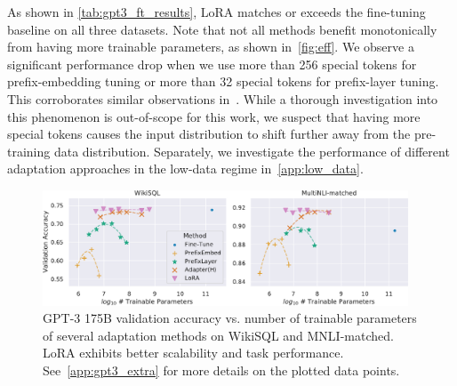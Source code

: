     






As shown in \autoref{tab:gpt3_ft_results}, LoRA matches or exceeds the fine-tuning baseline on all three datasets.
Note that not all methods benefit monotonically from having more trainable parameters, as shown in~\autoref{fig:eff}.
We observe a significant performance drop when we use more than 256 special tokens for prefix-embedding tuning or more than 32 special tokens for prefix-layer tuning.
This corroborates similar observations in~\cite{li_prefix-tuning_2021}.
While a thorough investigation into this phenomenon is out-of-scope for this work, we suspect that having more special tokens causes the input distribution to shift further away from the pre-training data distribution.
Separately, we investigate the performance of different adaptation approaches in the low-data regime in~\autoref{app:low_data}.









\begin{figure}[h]
\centering
\includegraphics[width=0.97\textwidth]{figures/LoRA_wikisql.pdf}
\caption{GPT-3 175B validation accuracy vs. number of trainable parameters of several adaptation methods on WikiSQL and MNLI-matched. LoRA exhibits better scalability and task performance. See~\autoref{app:gpt3_extra} for more details on the plotted data points.}
\label{fig:eff}
\end{figure}

